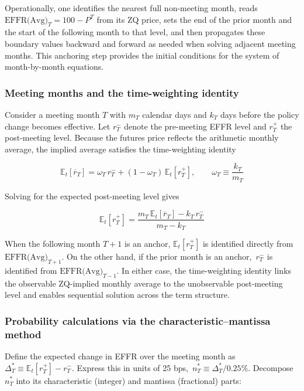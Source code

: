 Operationally, one identifies the nearest full non-meeting month, reads $\text{EFFR(Avg)}_{T}=100-P^T$ from its ZQ price, sets the end of the prior month and the start of the following month to that level, and then propagates these boundary values backward and forward as needed when solving adjacent meeting months. This anchoring step provides the initial conditions for the system of month-by-month equations.

\subsubsection{Meeting months and the time-weighting identity}

Consider a meeting month $T$ with $m_T$ calendar days and $k_T$ days before the policy change becomes effective. Let $r_T^{-}$ denote the pre-meeting EFFR level and $r_T^{+}$ the post-meeting level. Because the futures price reflects the arithmetic monthly average, the implied average satisfies the time-weighting identity

$$\mathbb{E}_t[\overline{r}_T] = \omega_T\, r_T^{-} + (1-\omega_T)\,\mathbb{E}_t[r_T^{+}], \qquad \omega_T \equiv \frac{k_T}{m_T}$$

Solving for the expected post-meeting level gives

$$\mathbb{E}_t[r_T^{+}] = \frac{m_T\,\mathbb{E}_t[\overline{r}_T] - k_T\, r_T^{-}}{m_T-k_T}$$

When the following month $T{+}1$ is an anchor, $\mathbb{E}_t[r_T^{+}]$ is identified directly from $\text{EFFR(Avg)}_{T+1}$. On the other hand, if the prior month is an anchor, $\,r_T^{-}$ is identified from $\text{EFFR(Avg)}_{T-1}$. In either case, the time-weighting identity links the observable ZQ-implied monthly average to the unobservable post-meeting level and enables sequential solution across the term structure.

\subsubsection{Probability calculations via the characteristic–mantissa method}

Define the expected change in EFFR over the meeting month as $\Delta_T^{*} \equiv \mathbb{E}_t[r_T^{+}] - r_T^{-}$. Express this in units of 25 bps, $\,n_T^{*} \equiv \Delta_T^{*}/0.25\%$. Decompose $n_T^{*}$ into its characteristic (integer) and mantissa (fractional) parts:

